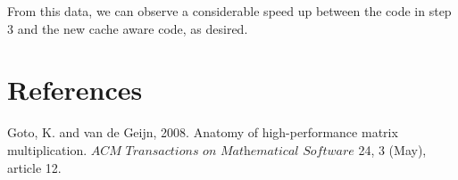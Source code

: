 \documentclass[12pt]{article}
\newcommand{\0}{\mathbf{0}}
\begin{document}
	From this data, we can observe a considerable speed up between the code in step 3 and the new cache aware code, as desired. 
	
	\section{References}
	
	Goto, K. and van de Geijn, 2008. Anatomy of high-performance matrix multiplication. $\textit{ACM Transactions on  Mathematical Software}$ 24, 3 (May), article 12. 
	
\end{document}
